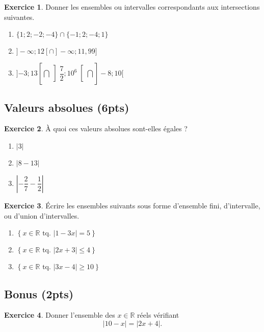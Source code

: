 \documentclass[a4paper, 14pt]{extarticle}
\theoremstyle{plain}
\theoremstyle{definition}
\newtheorem{ex}{Exercice}
\newcommand{\R}{\mathbb{R}}
\newcommand{\xRtq}[1]{
	$\left\{ x \in \R \text{ tq. } #1 \right\}$
}
\newcommand{\vabs}[1]{
	\left| #1 \right|
}
\newcommand{\minfty}{{-}\infty}
\newcommand{\exe}[2]{
		\begin{ex} #1  \end{ex}
		\begin{sol} #2 \end{sol}
	}
\newcommand{\exe}[2]{
		\begin{ex} #1  \end{ex}
	}
\begin{document}
\exe{
	Donner les ensembles ou intervalles correspondants aux intersections suivantes.
	\begin{multicols}{2}
	\begin{enumerate}
		\item $\{ 1 ; 2 ; -2 ; -4 \} \cap \{  -1; 2 ; -4 ; 1\}$
		\item $ ]\minfty ; 12[ \cap ]\minfty ; 11{,}99]$
		\item $]{-3};13[ \bigcap \left]\dfrac72; 10^6\right[ \bigcap ]{-}8; 10[$
	\end{enumerate}
	\end{multicols}
}
{


}


\subsection*{Valeurs absolues (6pts)}


\exe{
	À  quoi ces valeurs absolues sont-elles égales ?
	\begin{multicols}{2}
	\begin{enumerate}
		\item $\vabs{3}$
		\item $\vabs{8-13}$
		\item $\vabs{-\dfrac27 - \dfrac12}$
	\end{enumerate}
	\end{multicols}
}
{


}

\exe{
	Écrire les ensembles suivants sous forme d'ensemble fini, d'intervalle, ou d'union d'intervalles.
	\begin{multicols}{2}
	\begin{enumerate}
		\item \xRtq{\vabs{1-3x} = 5}
		\item \xRtq{\vabs{2x + 3} \leq 4}
		\item \xRtq{\vabs{3x-4} \geq 10}
	\end{enumerate}
	\end{multicols}
}
{
}

\subsection*{Bonus (2pts)}

\exe{
	Donner l'ensemble des $x\in\R$ réels vérifiant
		\[ |10 - x| = |2x + 4|. \]
}
{
}
\end{document}
